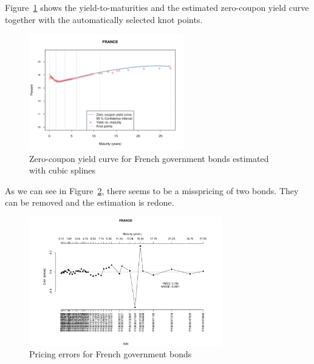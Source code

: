 
Figure~\ref{fig:frenchspotcurve} shows the yield-to-maturities and the estimated zero-coupon yield curve together with the automatically selected knot points.

\begin{figure}[htb]
\centering
\includegraphics[width=0.6\textwidth]{fig_frenchspotcurve}
\caption{Zero-coupon yield curve for French government bonds estimated with cubic splines}
\label{fig:frenchspotcurve}
\end{figure}



As we can see in Figure~\ref{fig:pricingerrors}, there seems to be a misspricing of two bonds. They can be removed and the estimation is redone.

\begin{figure}[htb]
\centering  
\includegraphics[width=0.75\textwidth]{fig_pricingerrors}
\caption{Pricing errors for French government bonds} 
\label{fig:pricingerrors}
\end{figure}

